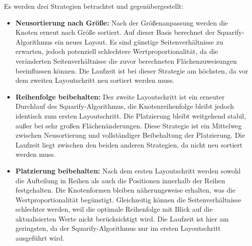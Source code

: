 Es werden drei Strategien betrachtet und gegenübergestellt:
\begin{itemize}
    \item \textbf{Neusortierung nach Größe:} Nach der Größenanpassung werden die Knoten erneut nach Größe sortiert. Auf dieser Basis berechnet der Squarify-Algorithmus ein neues Layout. Es sind günstige Seitenverhältnisse zu erwarten, jedoch potenziell schlechtere Wertproportionalität, da die veränderten Seitenverhältnisse die zuvor berechneten Flächenzuweisungen beeinflussen können. Die Laufzeit ist bei dieser Strategie am höchsten, da vor dem zweiten Layoutschritt neu sortiert werden muss.
    \item \textbf{Reihenfolge beibehalten:} Der zweite Layoutschritt ist ein erneuter Durchlauf des Squarify-Algorithmus, die Knotenreihenfolge bleibt jedoch identisch zum ersten Layoutschritt. Die Platzierung bleibt weitgehend stabil, außer bei sehr großen Flächenänderungen. Diese Strategie ist ein Mittelweg zwischen Neusortierung und vollständiger Beibehaltung der Platzierung. Die Laufzeit liegt zwischen den beiden anderen Strategien, da nicht neu sortiert werden muss.
    \item \textbf{Platzierung beibehalten:} Nach dem ersten Layoutschritt werden sowohl die Aufteilung in Reihen als auch die Positionen innerhalb der Reihen festgehalten. Die Knotenformen bleiben näherungsweise erhalten, was die Wertproportionalität begünstigt. Gleichzeitig können die Seitenverhältnisse schlechter werden, weil die optimale Reihenfolge mit Blick auf die aktualisierten Werte nicht berücksichtigt wird. Die Laufzeit ist hier am geringsten, da der Squarify-Algorithmus nur im ersten Layoutschritt ausgeführt wird.
\end{itemize}

